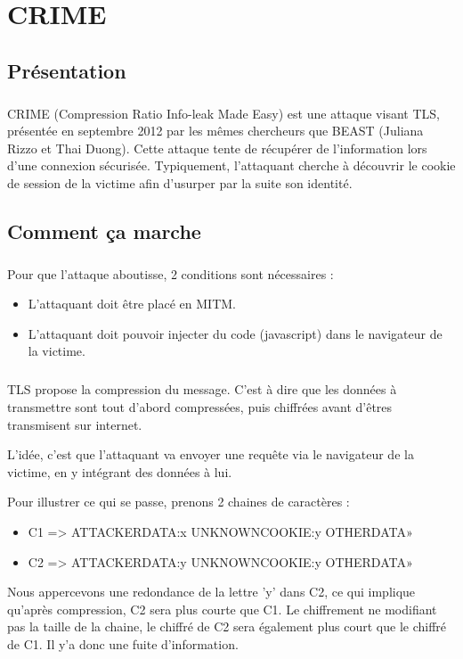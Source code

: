 \chapter{CRIME}
\label{chapter:crime}

\section{Présentation}
\paragraph{}
CRIME (Compression Ratio Info-leak Made Easy) est une attaque visant TLS, présentée en septembre 2012 par les mêmes chercheurs que BEAST (Juliana Rizzo et Thai Duong). Cette attaque tente de récupérer de l'information lors d'une connexion sécurisée. Typiquement, l'attaquant cherche à découvrir le cookie de session de la victime afin d'usurper par la suite son identité.

\section{Comment ça marche}
\paragraph{}
Pour que l'attaque aboutisse, 2 conditions sont nécessaires :
\begin{itemize}
  \item L'attaquant doit être placé en MITM.
  \item L'attaquant doit pouvoir injecter du code (javascript) dans le navigateur de la victime.
\end{itemize}

\paragraph{}
TLS propose la compression du message. C'est à dire que les données à transmettre sont tout d'abord compressées, puis chiffrées avant d'êtres transmisent sur internet.

L'idée, c'est que l'attaquant va envoyer une requête via le navigateur de la victime, en y intégrant des données à lui.

Pour illustrer ce qui se passe, prenons 2 chaines de caractères :
\begin{itemize}
\item C1 => ATTACKERDATA:x UNKNOWNCOOKIE:y OTHERDATA»
\item C2 => ATTACKERDATA:y UNKNOWNCOOKIE:y OTHERDATA»
\end{itemize}
Nous appercevons une redondance de la lettre 'y' dans C2, ce qui implique qu'après compression, C2 sera plus courte que C1. Le chiffrement ne modifiant pas la taille de la chaine, le chiffré de C2 sera également plus court que le chiffré de C1. Il y'a donc une fuite d'information.

